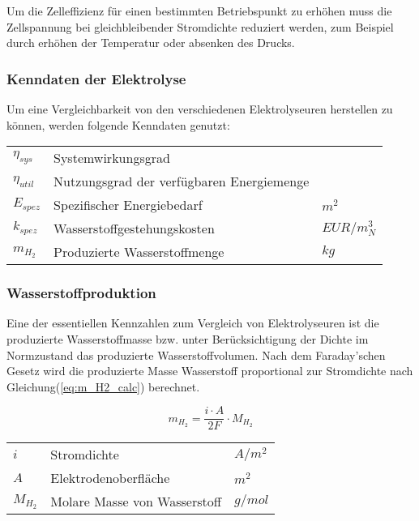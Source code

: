\documentclass[onecolumn,10pt,titlepage]{article}
\begin{document}
			Um die Zelleffizienz für einen bestimmten Betriebspunkt zu erhöhen muss die Zellspannung bei gleichbleibender Stromdichte reduziert werden, zum Beispiel durch erhöhen der Temperatur oder absenken des Drucks.
			
			\subsubsection{Kenndaten der Elektrolyse}
			\label{subsubb_Kenndaten}
			Um eine Vergleichbarkeit von den verschiedenen Elektrolyseuren herstellen zu können, werden folgende Kenndaten genutzt:
			
			\begin{table}[H]
				\begin{tabular*}{\textwidth}{lll}
					$\eta_{sys}$&Systemwirkungsgrad&\\
					$\eta_{util}$&Nutzungsgrad der verfügbaren Energiemenge&\\
					$E_{spez}$&Spezifischer Energiebedarf&$m^2$\\
					$k_{spez}$&Wasserstoffgestehungskosten&$EUR/m^3_N$\\
					$m_{H_2}$&Produzierte Wasserstoffmenge&$kg$\\
				\end{tabular*}
			\end{table}
			
			\subsubsection*{Wasserstoffproduktion}
			Eine der essentiellen Kennzahlen zum Vergleich von Elektrolyseuren ist die produzierte Wasserstoffmasse bzw. unter Berücksichtigung der Dichte im Normzustand das produzierte Wasserstoffvolumen. Nach dem Faraday’schen Gesetz wird die produzierte Masse Wasserstoff proportional zur Stromdichte nach Gleichung(\ref{eq:m_H2_calc}) berechnet.\cite{Petipas.2013} 
			
			\begin{equation}
				m_{H_2}=\frac{i\cdot A}{2F}\cdot M_{H_2}
				\label{eq:m_H2_calc}
			\end{equation}
			
			\begin{table}[H]
				\begin{tabular*}{\textwidth}{lll}\\
					$i$&Stromdichte&$A/m^2$\\
					$A$&Elektrodenoberfläche&$m^2$\\
					$M_{H_2}$&Molare Masse von Wasserstoff&$g/mol$\\
				\end{tabular*}
			\end{table}
			
\end{document}
